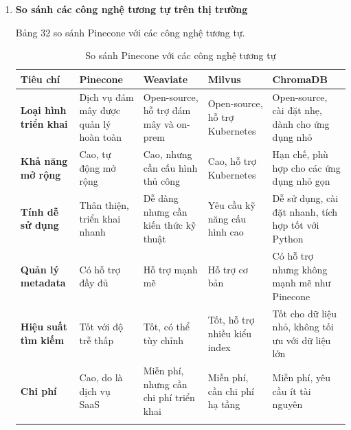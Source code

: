 \begin{enumerate}
	Nhược điểm:
	\begin{itemize}
		\item Chi phí: Pinecone có thể tốn kém hơn so với các giải pháp vector database tự quản lý hoặc mã nguồn mở.
		\item Khả năng tùy chỉnh hạn chế: Là dịch vụ đám mây, người dùng ít quyền kiểm soát đối với cấu trúc nội bộ so với các giải pháp tự quản lý.
		\item Phụ thuộc vào internet: Hiệu năng giảm khi tốc độ mạng không ổn định.
	\end{itemize}
	
		
	\item \textbf{So sánh các công nghệ tương tự trên thị trường}
	
	Bảng 32 so sánh Pinecone với các công nghệ tương tự.

		\begin{longtable}{|>{\raggedright\arraybackslash}m{2cm}|>{\raggedright\arraybackslash}m{3cm}|>{\raggedright\arraybackslash}m{3cm}|>{\raggedright\arraybackslash}m{3cm}|>{\raggedright\arraybackslash}m{3cm}|}
			\hline
			\textbf{Tiêu chí} & \textbf{Pinecone} & \textbf{Weaviate} & \textbf{Milvus} & \textbf{ChromaDB} \\ 
			\hline
			\textbf{Loại hình triển khai} & Dịch vụ đám mây được quản lý hoàn toàn & Open-source, hỗ trợ đám mây và on-prem & Open-source, hỗ trợ Kubernetes & Open-source, cài đặt nhẹ, dành cho ứng dụng nhỏ \\ 
			\hline
			\textbf{Khả năng mở rộng} & Cao, tự động mở rộng & Cao, nhưng cần cấu hình thủ công & Cao, hỗ trợ Kubernetes & Hạn chế, phù hợp cho các ứng dụng nhỏ gọn \\ 
			\hline
			\textbf{Tính dễ sử dụng} & Thân thiện, triển khai nhanh & Dễ dàng nhưng cần kiến thức kỹ thuật & Yêu cầu kỹ năng cấu hình cao & Dễ sử dụng, cài đặt nhanh, tích hợp tốt với Python \\ 
			\hline
			\textbf{Quản lý metadata} & Có hỗ trợ đầy đủ & Hỗ trợ mạnh mẽ & Hỗ trợ cơ bản & Có hỗ trợ nhưng không mạnh mẽ như Pinecone \\ 
			\hline
			\textbf{Hiệu suất tìm kiếm} & Tốt với độ trễ thấp & Tốt, có thể tùy chỉnh & Tốt, hỗ trợ nhiều kiểu index & Tốt cho dữ liệu nhỏ, không tối ưu với dữ liệu lớn \\ 
			\hline
			\textbf{Chi phí} & Cao, do là dịch vụ SaaS & Miễn phí, nhưng cần chi phí triển khai & Miễn phí, cần chi phí hạ tầng & Miễn phí, yêu cầu ít tài nguyên \\ 
			\hline
			\caption{So sánh Pinecone với các công nghệ tương tự}
		\end{longtable} 
	

\end{enumerate}
